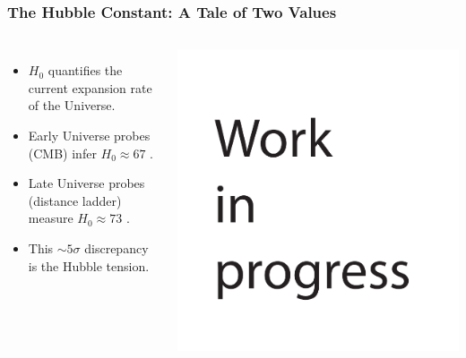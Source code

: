 \documentclass[aspectratio=169]{beamer}
\begin{document}
\begin{frame}
    \frametitle{The Hubble Constant: A Tale of Two Values}
    \begin{columns}
        \begin{itemize}
            \item $H_0$ quantifies the current expansion rate of the Universe.
            \item Early Universe probes (CMB) infer $H_0 \approx 67$ \kms. 
            \item Late Universe probes (distance ladder) measure $H_0 \approx 73$ \kms. 
            \item This $\sim 5\sigma$ discrepancy is the Hubble tension.
        \end{itemize}
        \includegraphics[width=\textwidth]{figures/Intro_H0_whisk.pdf}
    \end{columns}
\end{frame}
\end{document}
